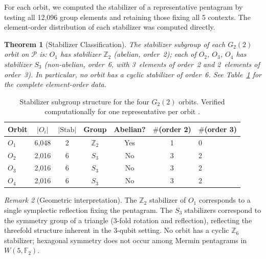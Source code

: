 \documentclass[11pt,a4paper]{article}
\newtheorem{theorem}{Theorem}[section]
\theoremstyle{remark}
\newtheorem{remark}[theorem]{Remark}
\newcommand{\PP}{\mathcal{P}}
\begin{document}
For each orbit, we computed the stabilizer of a representative pentagram by
testing all 12{,}096 group elements and retaining those fixing all 5 contexts.
The element-order distribution of each stabilizer was computed directly.

\begin{theorem}[Stabilizer Classification]\label{thm:stabilizer}
The stabilizer subgroup of each $G_2(2)$ orbit on $\PP$ is:
$O_1$ has stabilizer $\mathbb{Z}_2$ (abelian, order~2);
each of $O_2$, $O_3$, $O_4$ has stabilizer $S_3$ (non-abelian, order~6,
with 3~elements of order~2 and 2~elements of order~3).
In particular, no orbit has a cyclic stabilizer of order~6.
See Table~\ref{tab:stabilizers} for the complete element-order data.
\end{theorem}

\begin{table}[H]
\centering
\caption{Stabilizer subgroup structure for the four $G_2(2)$ orbits.
Verified computationally for one representative per orbit \cite{PaperXIVsuppl}.}
\label{tab:stabilizers}
\begin{tabular}{lcccccl}
\toprule
Orbit & $|O_i|$ & $|\mathrm{Stab}|$ & Group & Abelian?
      & $\#$(order 2) & $\#$(order 3) \\
\midrule
$O_1$ & 6{,}048 & 2 & $\mathbb{Z}_2$ & Yes & 1 & 0 \\
$O_2$ & 2{,}016 & 6 & $S_3$          & No  & 3 & 2 \\
$O_3$ & 2{,}016 & 6 & $S_3$          & No  & 3 & 2 \\
$O_4$ & 2{,}016 & 6 & $S_3$          & No  & 3 & 2 \\
\bottomrule
\end{tabular}
\end{table}

\begin{remark}[Geometric interpretation]
The $\mathbb{Z}_2$ stabilizer of $O_1$ corresponds to a single symplectic
reflection fixing the pentagram.
The $S_3$ stabilizers correspond to the symmetry group of a triangle
(3-fold rotation and reflection), reflecting the threefold structure
inherent in the 3-qubit setting.
No orbit has a cyclic $\mathbb{Z}_6$ stabilizer; hexagonal symmetry does not
occur among Mermin pentagrams in $W(5,\mathbb{F}_2)$.
\end{remark}
\end{document}
